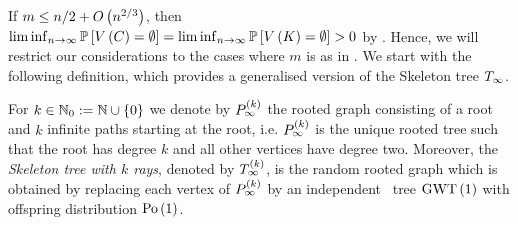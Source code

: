 If $m\leq n/2+O\left(n^{2/3}\right)$, then $\liminf_{n \to \infty}\mathbb{P}\left[V\left(C\right)=\emptyset\right]=\liminf_{n \to \infty}\mathbb{P}\left[V\left(K\right)=\emptyset\right]>0$ by . Hence, we will restrict our considerations to the cases where $m$ is as in . We start with the following definition, which provides a generalised version of the Skeleton tree $T_\infty$.
\begin{definition}
For $k\in\mathbb{N}_0:=\mathbb{N}\cup\left\{0\right\}$ we denote by $P_{\infty}^{\left(k\right)}$ the rooted graph consisting of a root and $k$ infinite paths starting at the root, i.e. $P_{\infty}^{\left(k\right)}$ is the unique rooted tree such that the root has degree $k$ and all other vertices have degree two. Moreover, the {\em Skeleton tree with $k$ rays}, denoted by $T_\infty^{\left(k\right)}$, is the random rooted graph which is obtained by replacing each vertex of $P_{\infty}^{\left(k\right)}$ by an independent \GW\ tree $\operatorname{GWT}\left(1\right)$ with offspring distribution $\operatorname{Po}\left(1\right)$.  
\end{definition}
